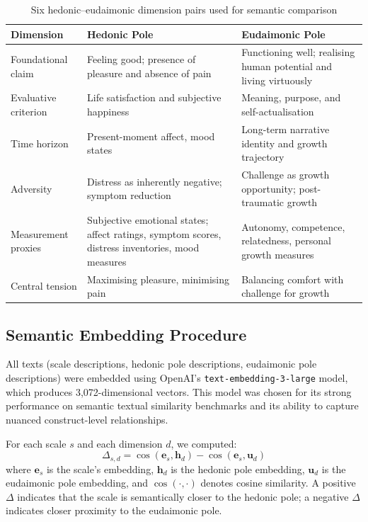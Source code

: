 \documentclass[12pt,a4paper]{article}
\newcommand{\Ddelta}{$\Delta$}
\begin{document}
\begin{table}[ht]
\caption{Six hedonic--eudaimonic dimension pairs used for semantic comparison}
\label{tab:dimensions}
\small
\begin{tabularx}{\textwidth}{lXX}
\toprule
\textbf{Dimension} & \textbf{Hedonic Pole} & \textbf{Eudaimonic Pole} \\
\midrule
Foundational claim & Feeling good; presence of pleasure and absence of pain & Functioning well; realising human potential and living virtuously \\
Evaluative criterion & Life satisfaction and subjective happiness & Meaning, purpose, and self-actualisation \\
Time horizon & Present-moment affect, mood states & Long-term narrative identity and growth trajectory \\
Adversity & Distress as inherently negative; symptom reduction & Challenge as growth opportunity; post-traumatic growth \\
Measurement proxies & Subjective emotional states; affect ratings, symptom scores, distress inventories, mood measures & Autonomy, competence, relatedness, personal growth measures \\
Central tension & Maximising pleasure, minimising pain & Balancing comfort with challenge for growth \\
\bottomrule
\end{tabularx}
\end{table}

\subsection{Semantic Embedding Procedure}\label{sec:embedding}

All texts (scale descriptions, hedonic pole descriptions, eudaimonic pole descriptions) were embedded using OpenAI's \texttt{text-embedding-3-large} model, which produces 3{,}072-dimensional vectors.
This model was chosen for its strong performance on semantic textual similarity benchmarks and its ability to capture nuanced construct-level relationships.

For each scale $s$ and each dimension $d$, we computed:
\begin{equation}
\Delta_{s,d} = \cos(\mathbf{e}_s, \mathbf{h}_d) - \cos(\mathbf{e}_s, \mathbf{u}_d)
\label{eq:delta}
\end{equation}
where $\mathbf{e}_s$ is the scale's embedding, $\mathbf{h}_d$ is the hedonic pole embedding, $\mathbf{u}_d$ is the eudaimonic pole embedding, and $\cos(\cdot,\cdot)$ denotes cosine similarity.
A positive \Ddelta{} indicates that the scale is semantically closer to the hedonic pole; a negative \Ddelta{} indicates closer proximity to the eudaimonic pole.
\end{document}
